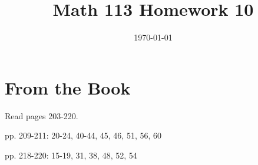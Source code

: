 \documentclass[fleqn,addpoints]{exam}
\title{Math 113 Homework 10}
\author{}
\date{\today}
\begin{document}
\maketitle



\section{From the Book}

\begin{itemize*}
  \item Read pages 203-220.
  \item pp. 209-211: 20-24, 40-44, 45, 46, 51, 56, 60
  \item pp. 218-220: 15-19, 31, 38, 48, 52, 54
\end{itemize*}

\ifprintanswers
\end{document}
